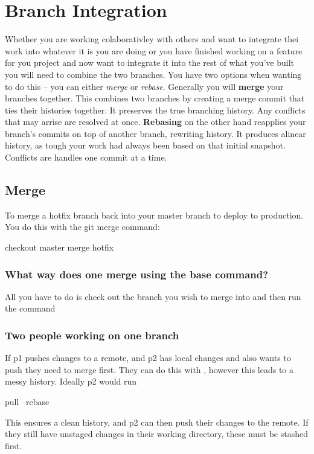 \chapter{Branch Integration}
\chapteroverlay
Whether you are working colaborativley with others and want to integrate thei work into whatever it is you are doing
or you have finished working on a feature for you project and now want to integrate it into the rest of what you've built
you will need to combine the two branches. You have two options when wanting to do this -- you can either \textit{merge} or 
\textit{rebase}. 
\newline\noindent Generally you will \textbf{merge} your branches together. This combines two branches by creating a merge commit
that ties their histories together. It preserves the true branching history. Any conflicts that may arrise are resolved at once.
\newline\noindent \textbf{Rebasing} on the other hand reapplies your branch's commits on top of another branch, rewriting history. 
It produces alinear history, as tough your work had always been based on that initial snapshot. Conflicts are handles one commit at a time.




\section{Merge}
To merge a hotfix branch back into your master branch to deploy to production. You do this with the git merge command:
\begin{gitBashBox}
checkout master
merge hotfix
\end{gitBashBox}

\subsection{What way does one merge using the base command?}
 All you have to do is check out the branch you wish to merge into and then run the  command
 
\subsection{Two people working on one branch}
If p1 pushes changes to a remote, and p2 has local changes and also wants to push they need to merge first. They can do this with , however this leads to a messy history. Ideally p2 would run 
\begin{gitBashBox}
pull --rebase
\end{gitBashBox}
This ensures a clean history, and p2 can then push their changes to the remote. If they still have unstaged changes in their working directory, these must be stashed first.

